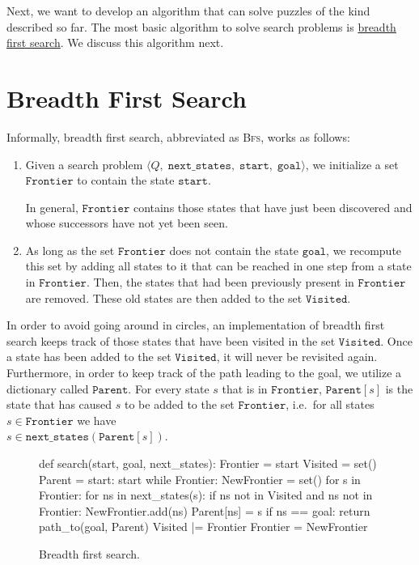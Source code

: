 Next, we want to develop an algorithm that can solve puzzles of the kind described so far.  The most basic
algorithm to solve search problems is \href{https://en.wikipedia.org/wiki/Breadth-first_search}{breadth first search}.
We discuss this algorithm next.

\section{Breadth First Search}
Informally, breadth first search, abbreviated as \textsc{Bfs}, works as follows: 
\begin{enumerate}
\item Given a search problem $\langle Q,\;\mathtt{next\_states},\; \mathtt{start},\; \mathtt{goal}\rangle$,
      we initialize a set $\texttt{Frontier}$ to contain the state $\texttt{start}$.

      In general, $\texttt{Frontier}$ contains those states that have just been discovered and whose successors have not
      yet been seen.
\item As long as the set $\texttt{Frontier}$ does not contain the state $\texttt{goal}$, we recompute this set
      by adding all states to it that can be reached in one step from a state in $\texttt{Frontier}$.
      Then, the states that had been previously present in $\texttt{Frontier}$ are removed.
      These old states are then added to the set $\texttt{Visited}$.
\end{enumerate}
In order to avoid going around in circles, an implementation of breadth first search keeps track of those
states that have been visited in the set $\texttt{Visited}$.  Once a state has been added to
the set $\texttt{Visited}$,  it will never be revisited again.
Furthermore, in order to keep track of the path leading to the goal, we utilize a dictionary called
$\texttt{Parent}$.  For every state $s$ that is in $\texttt{Frontier}$, $\mathtt{Parent}[s]$ is the state that
has caused $s$ to be added to the set $\texttt{Frontier}$, i.e.~for all states $s\in\mathtt{Frontier}$ 
we have 
\\[0.2cm]
\hspace*{1.3cm}
$s \in \mathtt{next\_states}(\mathtt{Parent}[s])$.


\begin{figure}[!ht]
\centering
\begin{python3code}
    def search(start, goal, next_states):
        Frontier = { start }
        Visited  = set()
        Parent   = { start: start }
        while Frontier:
            NewFrontier = set()
            for s in Frontier:
                for ns in next_states(s):
                    if ns not in Visited and ns not in Frontier:
                        NewFrontier.add(ns)
                        Parent[ns] = s
                        if ns == goal:
                            return path_to(goal, Parent)
            Visited |= Frontier
            Frontier = NewFrontier
\end{python3code}
\vspace*{-0.3cm}
\caption{Breadth first search.}
\label{fig:Breadth-First-Search.ipynb}
\end{figure}
\vspace*{0.2cm}

